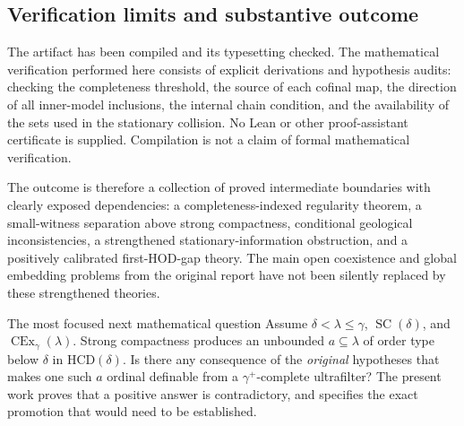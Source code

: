 \documentclass[11pt,letterpaper]{article}
\theoremstyle{definition}
\newcommand{\SC}{\operatorname{SC}}
\newcommand{\CEx}{\operatorname{CEx}}
\newcommand{\HCD}{\mathrm{HCD}}
\newcommand{\Cex}[2]{\CEx_{#1}(#2)}
\theoremstyle{remark}
\begin{document}
\subsection{Verification limits and substantive outcome}

The artifact has been compiled and its typesetting checked. The mathematical verification performed here consists of explicit derivations and hypothesis audits: checking the completeness threshold, the source of each cofinal map, the direction of all inner-model inclusions, the internal chain condition, and the availability of the sets used in the stationary collision. No Lean or other proof-assistant certificate is supplied. Compilation is not a claim of formal mathematical verification.

The outcome is therefore a collection of proved intermediate boundaries with clearly exposed dependencies: a completeness-indexed regularity theorem, a small-witness separation above strong compactness, conditional geological inconsistencies, a strengthened stationary-information obstruction, and a positively calibrated first-HOD-gap theory. The main open coexistence and global embedding problems from the original report have not been silently replaced by these strengthened theories.

\begin{assessment}{The most focused next mathematical question}
Assume $\delta<\lambda\leq\gamma$, $\SC(\delta)$, and $\Cex{\gamma}{\lambda}$. Strong compactness produces an unbounded $a\subseteq\lambda$ of order type below $\delta$ in $\HCD(\delta)$. Is there any consequence of the \emph{original} hypotheses that makes one such $a$ ordinal definable from a $\gamma^+$-complete ultrafilter? The present work proves that a positive answer is contradictory, and specifies the exact promotion that would need to be established.
\end{assessment}
\end{document}

